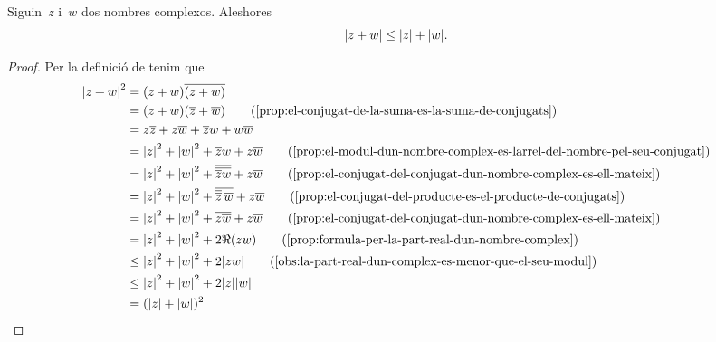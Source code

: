 \documentclass[../analisi-complexa.tex]{subfiles}
\begin{document}
    \begin{proposition}
        \label{prop:desigualta-triangular-nombres-complexos}
        Siguin~\(z\) i~\(w\) dos nombres complexos.
        Aleshores
        \[
            \modul{z+w} \leq \modul{z}+\modul{w}.
        \]
    \end{proposition}
    \begin{proof}
        Per la definició de  tenim que
        \begin{align*}
            \modul{z+w}^{2} &= (z+w)\conjugat{(z+w)} \\
                            &= (z+w)(\conjugat{z}+\conjugat{w})
                            \tag{\ref{prop:el-conjugat-de-la-suma-es-la-suma-de-conjugats}} \\
                            &= z\conjugat{z}+z\conjugat{w}
                               +\conjugat{z}w+w\conjugat{w} \\
                            &= \modul{z}^{2}+\modul{w}^{2}
                               +\conjugat{z}w+z\conjugat{w}
                            \tag{\ref{prop:el-modul-dun-nombre-complex-es-larrel-del-nombre-pel-seu-conjugat}} \\
                            &= \modul{z}^{2}+\modul{w}^{2}
                               +\conjugat{\conjugat{\conjugat{z}w}}+z\conjugat{w}
                               \tag{\ref{prop:el-conjugat-del-conjugat-dun-nombre-complex-es-ell-mateix}} \\
                            &= \modul{z}^{2}+\modul{w}^{2}
                               +\conjugat{\conjugat{\conjugat{z}}\,\conjugat{w}}+z\conjugat{w}
                            \tag{\ref{prop:el-conjugat-del-producte-es-el-producte-de-conjugats}} \\
                            &= \modul{z}^{2}+\modul{w}^{2}
                               +\conjugat{z\conjugat{w}}+z\conjugat{w}
                            \tag{\ref{prop:el-conjugat-del-conjugat-dun-nombre-complex-es-ell-mateix}} \\
                            &= \modul{z}^{2}+\modul{w}^{2}+2\Re(zw)
                            \tag{\ref{prop:formula-per-la-part-real-dun-nombre-complex}} \\
                            &\leq \modul{z}^{2}+\modul{w}^{2}+2\modul{zw}
                            \tag{\ref{obs:la-part-real-dun-complex-es-menor-que-el-seu-modul}} \\
                            &\leq \modul{z}^{2}+\modul{w}^{2}
                                  +2\modul{z}\modul{w} \\
                            &= (\modul{z}+\modul{w})^{2}
        \end{align*}
    \end{proof}
\end{document}
